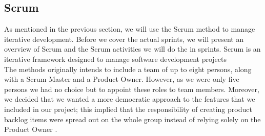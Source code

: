 \subsection{Scrum}
As mentioned in the previous section, we will use the Scrum method to manage iterative development. Before we cover the actual sprints, we will present an overview of Scrum and the Scrum activities we will do the in sprints.
\newline
Scrum is an iterative framework designed to manage software development projects \cite{scrumguide} \\
The methods originally intends to include a team of up to eight persons, along with a Scrum Master and a Product Owner. However, as we were only five persons we had no choice but to appoint these roles to team members. Moreover, we decided that we wanted a more democratic approach to the features that we included in our project; this implied that the responsibility of creating product backlog items were spread out on the whole group instead of relying solely on the Product Owner \cite[p.~12]{scrumguide}.
